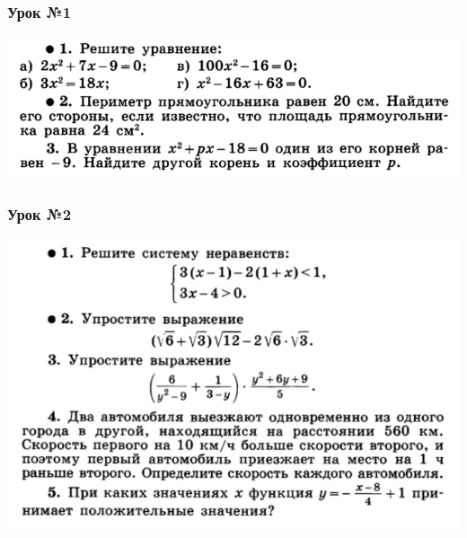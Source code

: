 \documentclass[algebra,a5paper]{pum}
\date{14.05.20}
\begin{document}
\subsubsection*{Урок №1}
\includegraphics[width=\textwidth]{img/24-1.png}

\subsubsection*{Урок №2}
\includegraphics[width=\textwidth]{img/24-2.png}
\end{document}
